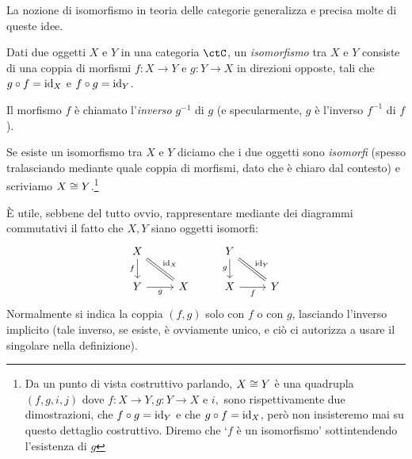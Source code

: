 La nozione di isomorfismo in teoria delle categorie generalizza e precisa molte di queste idee.
\begin{definition}[Isomorfismo]\label{def_isomorfismo}
	Dati due oggetti \(X\) e \(Y\) in una categoria \(\ctC\), un \emph{isomorfismo} tra \(X\) e \(Y\) consiste di una coppia di morfismi \(f:X\to Y\) e \(g:Y\to X\) in direzioni opposte, tali che \(g\circ f=\mathrm{id}_X\) e \(f\circ g=\mathrm{id}_Y\).

	Il morfismo \(f\) è chiamato l'\emph{inverso} \(g^{-1}\) di \(g\) (e specularmente, \(g\) è l'inverso \(f^{-1}\) di \(f\)).

	Se esiste un isomorfismo tra \(X\) e \(Y\) diciamo che i due oggetti sono \emph{isomorfi} (spesso tralasciando mediante quale coppia di morfismi, dato che è chiaro dal contesto) e scriviamo \(X\cong Y\).\footnote{Da un punto di vista costruttivo parlando, \(X\cong Y\) è una quadrupla \((f,g, i,j)\) dove \(f : X\to Y, g: Y\to X\) e \(i,\) sono rispettivamente due dimostrazioni, che \(f\circ g= \mathrm{id}_Y\) e che \(g\circ f=\mathrm{id}_X\), però non insisteremo mai su questo dettaglio costruttivo. Diremo che `$f$ è un isomorfismo' sottintendendo l'esistenza di $g$}
\end{definition}
\`E utile, sebbene del tutto ovvio, rappresentare mediante dei diagrammi commutativi il fatto che \(X,Y\) siano oggetti isomorfi: %
\[
	\begin{tikzcd}
		X\ar[d, "f"'] \ar[dr, equal, "\id_X"]& & Y \ar[dr, equal, "\id_Y"]\ar[d,"g"']\\
		Y \ar[r, "g"']& X & X \ar[r, "f"']& Y
	\end{tikzcd}
\]
Normalmente si indica la coppia \((f,g)\) solo con \(f\) o con \(g\), lasciando l'inverso implicito (tale inverso, se esiste, è ovviamente unico, e ciò ci autorizza a usare il singolare nella definizione).
